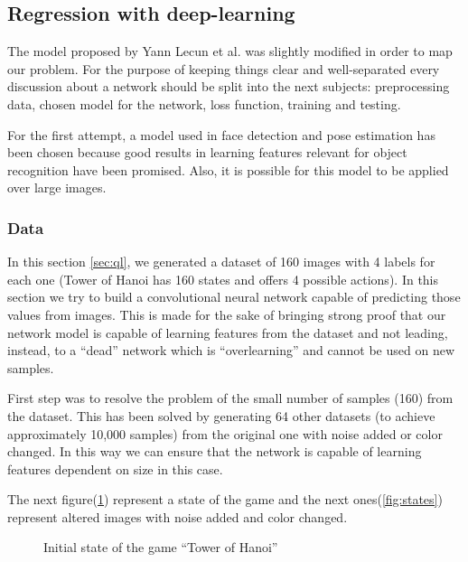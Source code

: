 \subsection{Regression with deep-learning}
The model proposed by Yann Lecun et al.\cite{energy-based} was slightly modified in order to map our problem. For the purpose of keeping things clear and well-separated every discussion about a network should be split into the next subjects: preprocessing data, chosen model for the network, loss function, training and testing.

For the first attempt, a model used in face detection and pose estimation has been chosen because good results in learning features relevant for object recognition have been promised. Also, it is possible for this model to be applied over large images.

\subsubsection{Data}

In this section \ref{sec:ql}, we generated a dataset of 160 images with 4 labels for each one (Tower of Hanoi has 160 states and offers 4 possible actions). In this section we try to build a convolutional neural network capable of predicting those values from images. This is made for the sake of bringing strong proof that our network model is capable of learning features from the dataset and not leading, instead, to a ``dead'' network which is ``overlearning'' and cannot be used on new samples.

First step was to resolve the problem of the small number of samples (160) from the dataset. This has been solved by generating 64 other datasets (to achieve approximately 10,000 samples) from the original one with noise added or color changed. In this way we can ensure that the network is capable of learning features dependent on size in this case.

The next figure(\ref{fig:155}) represent a state of the game and the next ones(\ref{fig:states}) represent altered images with noise added and color changed.

\begin{figure}[h]
	\begin{center}
		\caption{Initial state of the game ``Tower of Hanoi''} \label{fig:155}
    \end{center}
\end{figure}

